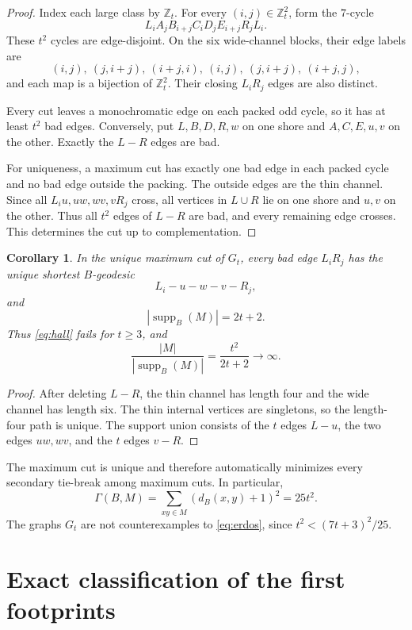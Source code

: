 \documentclass[11pt]{article}
\newtheorem{corollary}[theorem]{Corollary}
\theoremstyle{definition}
\newcommand{\supp}{\operatorname{supp}}
\begin{document}
\begin{proof}
Index each large class by \(\mathbb Z_t\). For every
\((i,j)\in\mathbb Z_t^2\), form the \(7\)-cycle
\[
 L_iA_jB_{i+j}C_iD_jE_{i+j}R_jL_i. \tag{3}
\]
These \(t^2\) cycles are edge-disjoint. On the six wide-channel blocks,
their edge labels are
\[
 (i,j),\ (j,i+j),\ (i+j,i),\ (i,j),\ (j,i+j),\ (i+j,j),
\]
and each map is a bijection of \(\mathbb Z_t^2\). Their closing
\(L_iR_j\) edges are also distinct.

Every cut leaves a monochromatic edge on each packed odd cycle, so it has
at least \(t^2\) bad edges. Conversely, put \(L,B,D,R,w\) on one shore
and \(A,C,E,u,v\) on the other. Exactly the \(L-R\) edges are bad.

For uniqueness, a maximum cut has exactly one bad edge in each packed
cycle and no bad edge outside the packing. The outside edges are the thin
channel. Since all \(L_i u,uw,wv,vR_j\) cross, all vertices in \(L\cup R\)
lie on one shore and \(u,v\) on the other. Thus all \(t^2\) edges of
\(L-R\) are bad, and every remaining edge crosses. This determines the
cut up to complementation.
\end{proof}

\begin{corollary}\label{cor:hall}
In the unique maximum cut of \(G_t\), every bad edge \(L_iR_j\) has the
unique shortest \(B\)-geodesic
\[
 L_i-u-w-v-R_j,
\]
and
\[
 |\supp_B(M)|=2t+2.
\]
Thus \eqref{eq:hall} fails for \(t\ge3\), and
\[
 \frac{|M|}{|\supp_B(M)|}=\frac{t^2}{2t+2}\longrightarrow\infty.
\]
\end{corollary}

\begin{proof}
After deleting \(L-R\), the thin channel has length four and the wide
channel has length six. The thin internal vertices are singletons, so the
length-four path is unique. The support union consists of the \(t\) edges
\(L-u\), the two edges \(uw,wv\), and the \(t\) edges \(v-R\).
\end{proof}

The maximum cut is unique and therefore automatically minimizes every
secondary tie-break among maximum cuts. In particular,
\[
 \Gamma(B,M)=\sum_{xy\in M}(d_B(x,y)+1)^2=25t^2.
\]
The graphs \(G_t\) are not counterexamples to \eqref{eq:erdos}, since
\(t^2<(7t+3)^2/25\).

\section{Exact classification of the first footprints}
\end{document}
